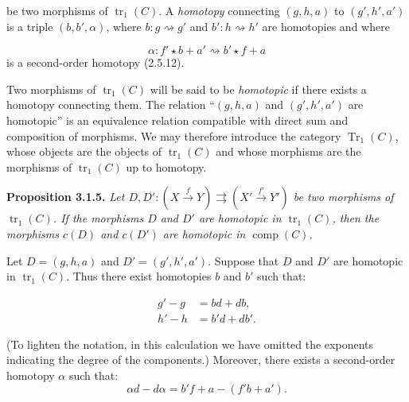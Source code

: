 \clearpage
{}%
be two morphisms of $\operatorname{tr}_1(C)$. A \emph{homotopy} connecting
$(g,h,a)$ to $(g',h',a')$ is a triple $(b,b',\alpha)$, where
$b\colon g\rightsquigarrow g'$ and $b'\colon h\rightsquigarrow h'$ are
homotopies and where

\begin{equation*}
  \alpha\colon f'\star b+a'\rightsquigarrow b'\star f+a
\end{equation*}
is a second-order homotopy (2.5.12).

Two morphisms of $\operatorname{tr}_1(C)$ will be said to be \emph{homotopic}
if there exists a homotopy connecting them.
The relation ``$(g,h,a)$ and $(g',h',a')$ are homotopic'' is an equivalence
relation compatible with direct sum and composition of morphisms.
We may therefore introduce the category $\operatorname{Tr}_1(C)$, whose
objects are the objects of $\operatorname{tr}_1(C)$ and whose morphisms are the
morphisms of $\operatorname{tr}_1(C)$ up to homotopy.

\noindent\textbf{Proposition 3.1.5.}\quad
\emph{Let
$D,D'\colon (X\xrightarrow{f}Y)\rightrightarrows
(X'\xrightarrow{f'}Y')$ be two morphisms of $\operatorname{tr}_1(C)$. If the
morphisms $D$ and $D'$ are homotopic in $\operatorname{tr}_1(C)$, then the
morphisms $c(D)$ and $c(D')$ are homotopic in $\operatorname{comp}(C)$.}

Let $D=(g,h,a)$ and $D'=(g',h',a')$. Suppose that $D$ and $D'$ are homotopic
in $\operatorname{tr}_1(C)$. Thus there exist homotopies $b$ and $b'$ such
that:

\begin{equation}
  \begin{aligned}
    g'-g&=bd+db,\\
    h'-h&=b'd+db'.
  \end{aligned}
  \tag{3.1.5.1}
\end{equation}

(To lighten the notation, in this calculation we have omitted the exponents
indicating the degree of the components.)
Moreover, there exists a second-order homotopy $\alpha$ such that:
\begin{equation*}
  \alpha d-d\alpha=b'f+a-(f'b+a').
\end{equation*}

